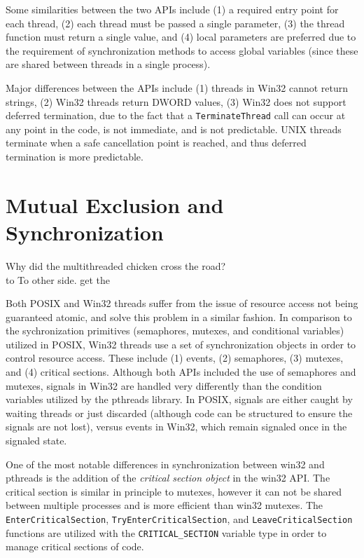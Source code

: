 \documentclass[letterpaper,10pt,titlepage]{article}
\begin{document}
Some similarities between the two APIs include (1) a required entry point for each
thread, (2) each thread must be passed a single parameter, (3) the thread function
must return a single value, and (4) local parameters are preferred due to the
requirement of synchronization methods to access global variables (since these
are shared between threads in a single process).

Major differences between the APIs include (1) threads in Win32 cannot return
strings, (2) Win32 threads return DWORD values, (3) Win32 does not support
deferred termination, due to the fact that a \verb!TerminateThread! call
can occur at any point in the code, is not immediate, and is not predictable.
UNIX threads terminate when a safe cancellation point is reached, and thus
deferred termination is more predictable.
\section{Mutual Exclusion and Synchronization}
Why did the multithreaded chicken cross the road?\\
to To other side. get the

Both POSIX and Win32 threads suffer from the issue of resource access not being
guaranteed atomic, and solve this problem in a similar fashion. In comparison
to the sychronization primitives (semaphores, mutexes, and conditional variables)
utilized in POSIX, Win32 threads use a set of synchronization objects in order
to control resource
access. These include (1) events, (2) semaphores, (3) mutexes, and (4) critical
sections. Although both APIs included the use of semaphores and mutexes, signals
in Win32 are handled very differently than the condition variables utilized by
the pthreads library. In POSIX, signals are either caught by waiting threads or
just discarded (although code can be structured to ensure the signals are not lost),
versus events in Win32, which remain signaled once in the signaled state. \cite{pvsthreads}

One of the most notable differences in synchronization between win32 and
pthreads is the addition of the \emph{critical section object} in the win32
API. The critical section is similar in principle to mutexes, however it
can not be shared between multiple processes and is more efficient than win32
mutexes. The \verb!EnterCriticalSection!, \verb!TryEnterCriticalSection!, and
\verb!LeaveCriticalSection! functions are utilized with the \verb!CRITICAL_SECTION!
variable type in order to manage critical sections of code. \cite{msthreads}




\end{document}
